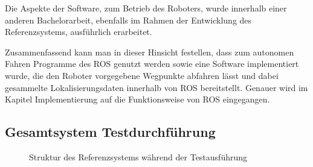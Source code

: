 Die Aspekte der Software, zum Betrieb des Roboters, wurde innerhalb einer anderen
Bachelorarbeit, ebenfalls im Rahmen der Entwicklung des Referenzsystems, ausführlich 
erarbeitet.

Zusammenfassend kann man in dieser Hinsicht festellen, dass zum autonomen Fahren
Programme des \gls{ROS} genutzt werden sowie eine Software implementiert wurde,
die den Roboter vorgegebene Wegpunkte abfahren lässt und dabei gesammelte
Lokalisierungsdaten innerhalb von \gls{ROS} bereitstellt. Genauer wird im
Kapitel Implementierung auf die Funktionsweise von \gls{ROS} eingegangen.

\subsection{Gesamtsystem Testdurchführung}
\begin{figure}[t]
  \begin{center}
  \end{center}
  \caption{Struktur des Referenzsystems während der Testausführung}
  \label{fig:referencetopo}
\end{figure}

